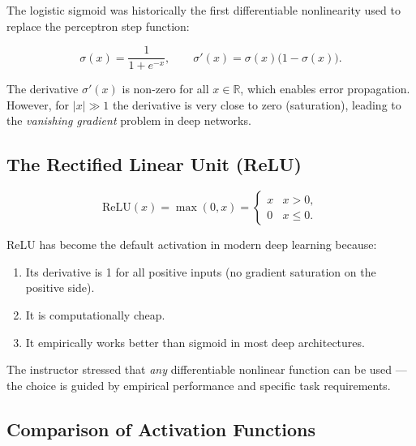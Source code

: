 \documentclass[12pt,a4paper]{article}
\begin{document}
The logistic sigmoid was historically the first differentiable nonlinearity
used to replace the perceptron step function:

\begin{equation}
  \sigma(x) = \frac{1}{1 + e^{-x}},\qquad
  \sigma'(x) = \sigma(x)\bigl(1 - \sigma(x)\bigr).
  \label{eq:sigmoid}
\end{equation}

The derivative $\sigma'(x)$ is non-zero for all $x \in \mathbb{R}$, which
enables error propagation.  However, for $|x| \gg 1$ the derivative is
very close to zero (saturation), leading to the \emph{vanishing gradient}
problem in deep networks.

\subsection{The Rectified Linear Unit (ReLU)}

\begin{equation}
  \text{ReLU}(x) = \max(0, x) =
  \begin{cases} x & x > 0,\\ 0 & x \leq 0. \end{cases}
  \label{eq:relu}
\end{equation}

ReLU has become the default activation in modern deep learning because:
\begin{enumerate}[noitemsep]
  \item Its derivative is 1 for all positive inputs (no gradient saturation on
        the positive side).
  \item It is computationally cheap.
  \item It empirically works better than sigmoid in most deep architectures.
\end{enumerate}

The instructor stressed that \emph{any} differentiable nonlinear function can
be used --- the choice is guided by empirical performance and specific task
requirements.

\subsection{Comparison of Activation Functions}
\end{document}
